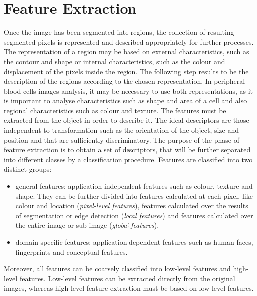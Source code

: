 \documentclass[final,a4paper,12pt,english]{UnicaPhdThesis3}
\begin{document}
\chapter{Feature Extraction} %
Once the image has been segmented into regions, the collection of resulting segmented pixels is represented and described appropriately for further processes. The representation of a region may be based on external characteristics, such as the contour and shape or internal characteristics, such as the colour and displacement of the pixels inside the region. The following step results to be the description of the regions according to the chosen representation. In peripheral blood cells images analysis, it may be necessary to use both representations, as it is important to analyse characteristics such as shape and area of a cell and also regional characteristics such as colour and texture. The features must be extracted from the object in order to describe it.
The ideal descriptors are those independent to transformation such as the orientation of the object, size and position and that are sufficiently discriminatory. The purpose of the phase of feature extraction is to obtain a set of descriptors, that will be further separated into different classes by a classification procedure. Features are classified into two distinct groups:
\begin{itemize}
\item general features: application independent features such as colour, texture and shape. They can be further divided into features calculated at each pixel, like colour and location (\textit{pixel-level features}), features calculated over the results of segmentation or edge detection (\textit{local features}) and features calculated over the entire image or sub-image (\textit{global features}).
\item domain-specific features: application dependent features such as human faces, fingerprints and conceptual features.
\end{itemize}
Moreover, all features can be coarsely classified into low-level features and high-level features. Low-level features can be extracted directly from the original images, whereas high-level feature extraction must be based on low-level features. 
\end{document}
